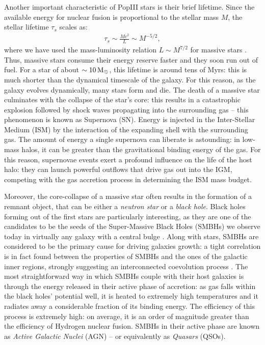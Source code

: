  Another important characteristic of PopIII stars is their brief lifetime. Since the available energy for nuclear fusion is proportional to the stellar mass $M$, the stellar lifetime $\tau_s$ scales as:
  \begin{align}
      \tau_s \sim \frac{Mc^2}{L} \sim M^{-5/2},
  \end{align}
  where we have used the mass-luminosity relation $L\sim M^{7/2}$ for massive stars \citep{griffiths88}. Thus, massive stars consume their energy reserve faster and they soon run out of fuel. For a star of about $\sim 10\,{\rm M}_{\odot}$, this lifetime is around tens of Myrs: this is much shorter than the dynamical timescale of the galaxy. For this reason, as the galaxy evolves dynamically, many stars form and die. The death of a massive star culminates with the collapse of the star's core: this results in a catastrophic explosion followed by shock waves propagating into the surrounding gas \citep{ostriker_supernovae} -- this phenomenon is known as Supernova (SN). Energy is injected in the Inter-Stellar Medium (ISM) by the interaction of the expanding shell with the surrounding gas. The amount of energy a single supernova can liberate is astounding: in low-mass halos, it can be greater than the gravitational binding energy of the gas. For this reason, supernovae events exert a profound influence on the life of the host halo: they can launch powerful outflows that drive gas out into the IGM, competing with the gas accretion process in determining the ISM mass budget. 
  
  Moreover, the core-collapse of a massive star often results in the formation of a remnant object, that can be either a \textit{neutron star} or a \textit{black hole}. Black holes forming out of the first stars are particularly interesting, as they are one of the candidates to be the seeds of the Super-Massive Black Holes (SMBHs) we observe today in virtually any galaxy with a central bulge \citep{Latif:2016qau}. Along with stars, SMBHs are considered to be the primary cause for driving galaxies growth: a tight correlation is in fact found between the properties of SMBHs and the ones of the galactic inner regions, strongly suggesting an interconnected coevolution process \citep{Kormendy:2013dxa}. The most straightforward way in which SMBHs couple with their host galaxies is through the energy released in their active phase of accretion: as gas falls within the black holes' potential well, it is heated to extremely high temperatures and it radiates away a considerable fraction of its binding energy. The efficiency of this process is extremely high: on average, it is an order of magnitude greater than the efficiency of Hydrogen nuclear fusion. SMBHs in their active phase are known as \textit{Active Galactic Nuclei} (AGN) -- or equivalently as \textit{Quasars} (QSOs).    
  
